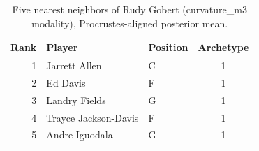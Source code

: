 \begin{table}[htbp]
  \centering\small
  \begin{tabular}{rllc}
    \toprule
    Rank & Player & Position & Archetype \\
    \midrule
    1 & Jarrett Allen & C & 1 \\
    2 & Ed Davis & F & 1 \\
    3 & Landry Fields & G & 1 \\
    4 & Trayce Jackson-Davis & F & 1 \\
    5 & Andre Iguodala & G & 1 \\
    \bottomrule
  \end{tabular}
  \caption{Five nearest neighbors of Rudy Gobert (curvature_m3 modality), Procrustes-aligned posterior mean.}
  \label{tab:Rudy_Gobert_neighbors_curvature_m3}
\end{table}

